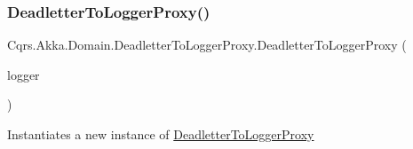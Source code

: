 \subsubsection{\texorpdfstring{Deadletter\+To\+Logger\+Proxy()}{DeadletterToLoggerProxy()}}
{\footnotesize\ttfamily Cqrs.\+Akka.\+Domain.\+Deadletter\+To\+Logger\+Proxy.\+Deadletter\+To\+Logger\+Proxy (\begin{DoxyParamCaption}\item[{I\+Logger}]{logger }\end{DoxyParamCaption})}



Instantiates a new instance of \hyperlink{classCqrs_1_1Akka_1_1Domain_1_1DeadletterToLoggerProxy}{Deadletter\+To\+Logger\+Proxy} 

